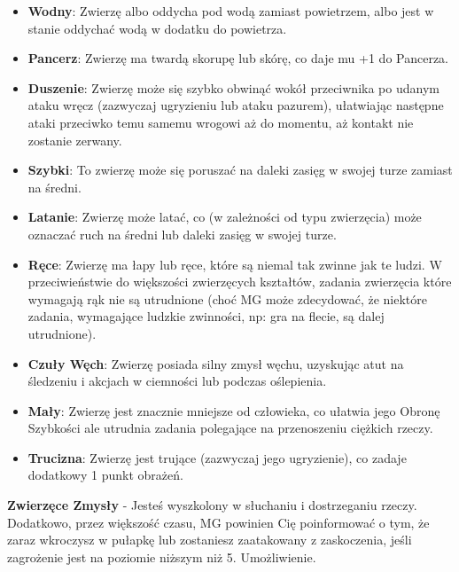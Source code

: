 \begin{table*}[t]
\begin{tabularx}{\textwidth}{| X | X | X |}
 \end{tabularx}
 \end{table*}
 
 \begin{itemize}

\item \textbf{Wodny}: Zwierzę albo oddycha pod wodą zamiast powietrzem, albo jest w stanie oddychać wodą w dodatku do powietrza.

\item \textbf{Pancerz}: Zwierzę ma twardą skorupę lub skórę, co daje mu +1 do Pancerza.

\item \textbf{Duszenie}: Zwierzę może się szybko obwinąć wokół przeciwnika po udanym ataku wręcz (zazwyczaj ugryzieniu lub ataku pazurem), ułatwiając następne ataki przeciwko temu samemu wrogowi aż do momentu, aż kontakt nie zostanie zerwany.

\item \textbf{Szybki}: To zwierzę może się poruszać na daleki zasięg w swojej turze zamiast na średni.

\item \textbf{Latanie}: Zwierzę może latać, co (w zależności od typu zwierzęcia) może oznaczać ruch na średni lub daleki zasięg w swojej turze. 

\item \textbf{Ręce}: Zwierzę ma łapy lub ręce, które są niemal tak zwinne jak te ludzi. W przeciwieństwie do większości zwierzęcych kształtów, zadania zwierzęcia które wymagają rąk nie są utrudnione (choć MG może zdecydować, że niektóre zadania, wymagające ludzkie zwinności, np: gra na flecie, są dalej utrudnione).

\item \textbf{Czuły Węch}: Zwierzę posiada silny zmysł węchu, uzyskując atut na śledzeniu i akcjach w ciemności lub podczas oślepienia. 

\item \textbf{Mały}: Zwierzę jest znacznie mniejsze od człowieka, co ułatwia jego Obronę Szybkości ale utrudnia zadania polegające na przenoszeniu ciężkich rzeczy.

\item \textbf{Trucizna}: Zwierzę jest trujące (zazwyczaj jego ugryzienie), co zadaje dodatkowy 1 punkt obrażeń. 

\end{itemize}

\textbf{Zwierzęce Zmysły}\label{sec:Zwierzęce Zmysły} - Jesteś wyszkolony w słuchaniu i dostrzeganiu rzeczy. Dodatkowo, przez większość czasu, MG powinien Cię poinformować o tym, że zaraz wkroczysz w pułapkę lub zostaniesz zaatakowany z zaskoczenia, jeśli zagrożenie jest na poziomie niższym niż 5. Umożliwienie. 

